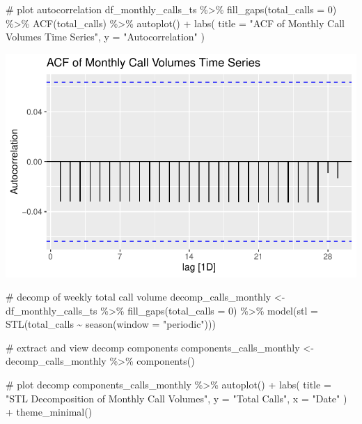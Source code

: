 \documentclass[
  letterpaper,
  DIV=11,
  numbers=noendperiod]{scrartcl}
\newenvironment{Shaded}{\begin{snugshade}}{\end{snugshade}}
\newcommand{\AttributeTok}[1]{\textcolor[rgb]{0.40,0.45,0.13}{#1}}
\newcommand{\CommentTok}[1]{\textcolor[rgb]{0.37,0.37,0.37}{#1}}
\newcommand{\DecValTok}[1]{\textcolor[rgb]{0.68,0.00,0.00}{#1}}
\newcommand{\FunctionTok}[1]{\textcolor[rgb]{0.28,0.35,0.67}{#1}}
\newcommand{\NormalTok}[1]{\textcolor[rgb]{0.00,0.23,0.31}{#1}}
\newcommand{\OtherTok}[1]{\textcolor[rgb]{0.00,0.23,0.31}{#1}}
\newcommand{\SpecialCharTok}[1]{\textcolor[rgb]{0.37,0.37,0.37}{#1}}
\newcommand{\StringTok}[1]{\textcolor[rgb]{0.13,0.47,0.30}{#1}}
\begin{document}
\begin{Shaded}
\begin{Highlighting}[]
\CommentTok{\# plot autocorrelation}
\NormalTok{df\_monthly\_calls\_ts }\SpecialCharTok{\%\textgreater{}\%}
  \FunctionTok{fill\_gaps}\NormalTok{(}\AttributeTok{total\_calls =} \DecValTok{0}\NormalTok{) }\SpecialCharTok{\%\textgreater{}\%}
  \FunctionTok{ACF}\NormalTok{(total\_calls) }\SpecialCharTok{\%\textgreater{}\%}
  \FunctionTok{autoplot}\NormalTok{() }\SpecialCharTok{+} 
  \FunctionTok{labs}\NormalTok{(}
    \AttributeTok{title =} \StringTok{"ACF of Monthly Call Volumes Time Series"}\NormalTok{,}
    \AttributeTok{y =} \StringTok{"Autocorrelation"}
\NormalTok{  )}
\end{Highlighting}
\end{Shaded}

\includegraphics{final_proj_group1_files/figure-pdf/aggregate_monthly_stl-2.pdf}

\begin{Shaded}
\begin{Highlighting}[]
\CommentTok{\# decomp of weekly total call volume}
\NormalTok{decomp\_calls\_monthly }\OtherTok{\textless{}{-}}\NormalTok{ df\_monthly\_calls\_ts }\SpecialCharTok{\%\textgreater{}\%}
  \FunctionTok{fill\_gaps}\NormalTok{(}\AttributeTok{total\_calls =} \DecValTok{0}\NormalTok{) }\SpecialCharTok{\%\textgreater{}\%}
  \FunctionTok{model}\NormalTok{(}\AttributeTok{stl =} \FunctionTok{STL}\NormalTok{(total\_calls }\SpecialCharTok{\textasciitilde{}} \FunctionTok{season}\NormalTok{(}\AttributeTok{window =} \StringTok{"periodic"}\NormalTok{)))}

\CommentTok{\# extract and view decomp components}
\NormalTok{components\_calls\_monthly }\OtherTok{\textless{}{-}}\NormalTok{ decomp\_calls\_monthly }\SpecialCharTok{\%\textgreater{}\%}
  \FunctionTok{components}\NormalTok{()}

\CommentTok{\# plot decomp}
\NormalTok{components\_calls\_monthly }\SpecialCharTok{\%\textgreater{}\%}
  \FunctionTok{autoplot}\NormalTok{() }\SpecialCharTok{+}
  \FunctionTok{labs}\NormalTok{(}
    \AttributeTok{title =} \StringTok{"STL Decomposition of Monthly Call Volumes"}\NormalTok{, }
    \AttributeTok{y =} \StringTok{"Total Calls"}\NormalTok{, }
    \AttributeTok{x =} \StringTok{"Date"}
\NormalTok{  ) }\SpecialCharTok{+}
  \FunctionTok{theme\_minimal}\NormalTok{()}
\end{Highlighting}
\end{Shaded}
\end{document}
